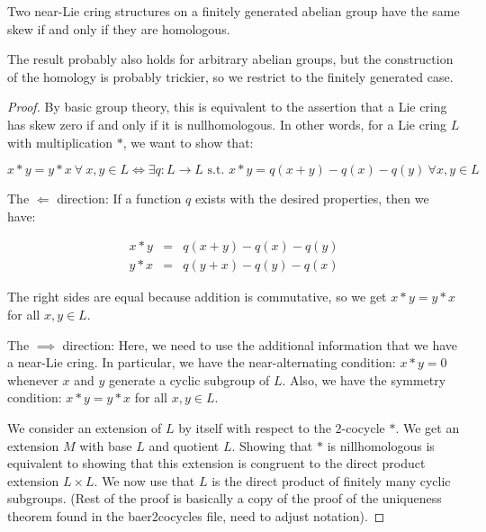 \documentclass[10pt]{amsart}
\begin{document}
\begin{theorem}
  Two near-Lie cring structures on a finitely generated abelian group
  have the same skew if and only if they are homologous. %
\end{theorem}

The result probably also holds for arbitrary abelian groups, but the
construction of the homology is probably trickier, so we restrict to
the finitely generated case.

\begin{proof}
  By basic group theory, this is equivalent to the assertion that a
  Lie cring has skew zero if and only if it is nullhomologous. In
  other words, for a Lie cring $L$ with multiplication $*$, we want to
  show that:

  $$x * y = y * x \ \forall \ x,y \in L \iff \exists q:L \to L \text{ s.t. } x * y = q(x + y) - q(x) - q(y) \ \forall x,y \in L$$

  The $\Leftarrow$ direction: If a function $q$ exists with the desired
  properties, then we have:

  \begin{eqnarray*}
    x * y & = & q(x + y) - q(x) - q(y) \\
    y * x & = & q(y + x) - q(y) - q(x)
  \end{eqnarray*}

  The right sides are equal because addition is commutative, so we get
  $x * y = y * x$ for all $x,y \in L$.

  The $\implies$ direction: Here, we need to use the additional
  information that we have a near-Lie cring. In particular, we have
  the near-alternating condition: $x * y = 0$ whenever $x$ and $y$
  generate a cyclic subgroup of $L$. Also, we have the symmetry
  condition: $x * y = y * x$ for all $x,y \in L$.

  We consider an extension of $L$ by itself with respect to the
  $2$-cocycle $*$. We get an extension $M$ with base $L$ and quotient
  $L$. Showing that $*$ is nillhomologous is equivalent to showing
  that this extension is congruent to the direct product extension $L
  \times L$. We now use that $L$ is the direct product of finitely
  many cyclic subgroups. (Rest of the proof is basically a copy of the
  proof of the uniqueness theorem found in the baer2cocycles file,
  need to adjust notation).
\end{proof}
\end{document}
